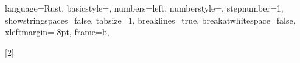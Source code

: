 \usepackage{xparse}

\usepackage{tabto}

\newcommand{\slide}[2][]{
    \begin{frame}
        \frametitle{
            #1
        }

        #2
    \end{frame}
}

\newcommand{\eq}[2]{
    \begin{equation}\label{#1}
        #2
    \end{equation}
}

\newcommand{\R}{\mathbb{R}}
\newcommand{\Rn}[1][n]{\mathbb{R}^#1}


\renewcommand{\listfigurename}{Figures}

\lstset
{
    language=Rust,
    basicstyle=\footnotesize,
    numbers=left,
    numberstyle=\tiny,
    stepnumber=1,
    showstringspaces=false,
    tabsize=1,
    breaklines=true,
    breakatwhitespace=false,
    xleftmargin=-8pt,
    frame=b,
}

\newcommand{\codefile}[3]{
    \mdframed[roundcorner=5pt, backgroundcolor=blue!30]
    
    \endmdframed
}
\newcommand{\codefilelines}[5]{
    \mdframed[roundcorner=5pt, backgroundcolor=blue!30]
    
    \endmdframed
}
[2]
{
    \mdframed[roundcorner=5pt, backgroundcolor=blue!30]
}
{
    \endmdframed
}
